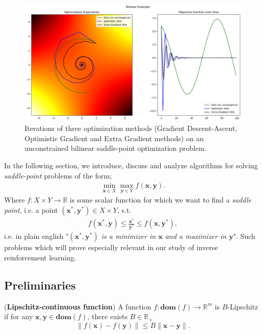 \begin{figure}[h!]
    \centering
    \includegraphics[width=\textwidth]{figures/bilinear_opt.png}
    \caption{Iterations of three optimization methods (Gradient Descent-Ascent, Optimistic Gradient and Extra Gradient methods) on an unconstrained bilinear saddle-point optimization problem.}
\end{figure}

In the following section, we introduce, discuss and analyze algorithms for solving \textit{saddle-point} problems of the form; 
\begin{align*}
    \min_{\bm{x} \in X} \max_{\bm{y} \in Y} f(\bm{x},\bm{y}).
\end{align*}
Where $f:X \times Y \rightarrow \mathbb{R}$ is some scalar function for which we want to find a \textit{saddle point}, i.e. a point $(\bm{x}^*,\bm{y}^*)\in X \times Y$, s.t.
\begin{align*}
    f(\bm{x}^*,\bm{y}) \leq \frac{\bm{x}^*}{\bm{y}^*} \leq f(\bm{x},\bm{y}^*),
\end{align*}
i.e. in plain english "\textit{$(\bm{x}^*,\bm{y}^*)$ is a minimizer in $\bm{x}$ and a maximizer in $\bm{y}$}". Such problems which will prove especially relevant in our study of inverse reinforcement learning. \\

\subsection{Preliminaries}

\begin{definition}
    (\textbf{Lipschitz-continuous function}) A function $f: \textbf{dom}(f) \rightarrow \mathbb{R}^m$ is $B$-Lipschitz if for any $\bm{x},\bm{y} \in \textbf{dom}(f)$, there exists $B \in \mathbb{R}_+$\:
    \[
      \|f(\bm{x})-f(\bm{y})\| \leq B \| \bm{x} - \bm{y} \|.
    \]
\end{definition}


